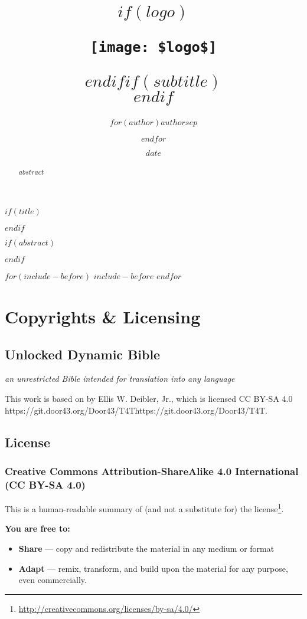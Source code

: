 \documentclass[$fontsize$pt,$if(lang)$$lang$,$endif$$if(papersize)$$papersize$,$endif$$for(classoption)$$classoption$$sep$,$endfor$,openany]{$documentclass$}
\title{$if(logo)$\begin{center}\texttt{[image: \$logo\$]}\end{center}\vspace{\baselineskip}$endif$\Huge $if(subtitle)$\\\vspace{0.5em}{\LARGE }$endif$}
\author{$for(author)$$author$$sep$ \and $endfor$}
\date{\small $date$}
\renewcommand{\href}[2]{#2\footnote{\url{#1}}}
\begin{document}

$if(title)$
  \maketitle
$endif$

$if(abstract)$
  \begin{abstract}
    $abstract$
  \end{abstract}
$endif$

\newpage
{}

$for(include-before)$
  $include-before$
$endfor$

\section{Copyrights \& Licensing}\label{copyrights-licensing}

\subsection{Unlocked Dynamic Bible}

\textit{an unrestricted Bible intended for translation into any language}

This work is based on  by Ellis W. Deibler, Jr., which is licensed CC BY-SA 4.0 {https://git.door43.org/Door43/T4T}{https://git.door43.org/Door43/T4T}.

\subsection{License}
\subsubsection{Creative Commons Attribution-ShareAlike 4.0 International (CC BY-SA 4.0)}

This is a human-readable summary of (and not a substitute for) the \href{http://creativecommons.org/licenses/by-sa/4.0/}{license}.

\textbf{You are free to:}

\begin{itemize}
\item \textbf{Share} — copy and redistribute the material in any medium or format
\item \textbf{Adapt} — remix, transform, and build upon the material for any purpose, even commercially.
\end{itemize}
\end{document}
